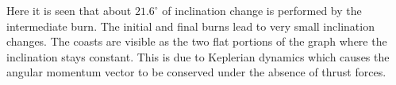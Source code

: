 Here it is seen that about $21.6^\circ$ of inclination change is performed by the  intermediate burn. The initial and final burns lead to very small inclination changes. The coasts are visible as the two flat portions of the graph where the inclination stays constant. This is due to Keplerian dynamics which causes the angular momentum vector to be conserved under the absence of thrust forces. 
